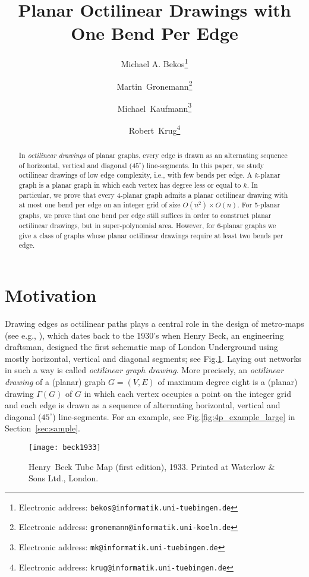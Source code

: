 \documentclass[a4paper,twoside,11pt]{article}
\title{Planar Octilinear Drawings with One Bend Per Edge}
\author[1]{Michael A. Bekos\thanks{Electronic address: \texttt{bekos@informatik.uni-tuebingen.de}}}
\author[2]{Martin~Gronemann\thanks{Electronic address: \texttt{gronemann@informatik.uni-koeln.de}}}
\author[1]{Michael~Kaufmann\thanks{Electronic address: \texttt{mk@informatik.uni-tuebingen.de}}}
\author[1]{Robert~Krug\thanks{Electronic address: \texttt{krug@informatik.uni-tuebingen.de}}}
\affil[1]{Wilhelm-Schickhard-Institut f\"ur Informatik, Universit\"at T\"ubingen, Germany}
\affil[2]{Institut f\"ur Informatik, Universit\"at zu K\"oln, Germany}
\date{}
\begin{document}
\maketitle

\begin{abstract}
In \emph{octilinear drawings} of planar graphs, every edge is drawn
as an alternating sequence of horizontal, vertical and diagonal
($45^\circ$) line-segments. In this paper, we study octilinear
drawings of low edge complexity, i.e., with few bends per edge. A
$k$-planar graph is a planar graph in which each vertex has degree
less or equal to $k$. In particular, we prove that every 4-planar
graph admits a planar octilinear drawing with at most one bend per
edge on an integer grid of size $O(n^2) \times O(n)$. For 5-planar
graphs, we prove that one bend per edge still suffices in order to
construct planar octilinear drawings, but in super-polynomial area.
However, for 6-planar graphs we give a class of graphs whose planar
octilinear drawings require at least two bends per edge.
\end{abstract}


\section{Motivation}
\label{sec:introduction}



Drawing edges as octilinear paths plays a central role in the design
of metro-maps (see e.g., \cite{HMN06,NW11,SROW11}), which dates back
to the 1930's when Henry Beck, an engineering draftsman, designed
the first schematic map of London Underground using mostly
horizontal, vertical and diagonal segments; see
Fig.\ref{fig:beck1933}. Laying out networks in such a way is called
\emph{octilinear graph drawing}. More precisely, an \emph{octilinear
drawing} of a (planar) graph $G=(V,E)$ of maximum degree eight is a
(planar) drawing $\Gamma(G)$ of $G$ in which each vertex occupies a
point on the integer grid and each edge is drawn as a sequence of
alternating horizontal, vertical and diagonal ($45^\circ$)
line-segments. For an example, see Fig.\ref{fig:4p_example_large} in
Section~\ref{sec:sample}.

\begin{figure}[t]
    \centering
    \texttt{[image: beck1933]}
    \caption{Henry~Beck Tube Map (first edition), 1933. Printed at Waterlow \& Sons Ltd., London.}
    \label{fig:beck1933}
\end{figure}
\end{document}
